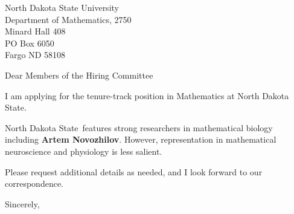 




	
	
	\def\School{North Dakota State}
	
	\begin{letter}
		{North Dakota State University\\
			Department of Mathematics, 2750\\
			Minard Hall 408\\
			PO Box 6050\\
			Fargo ND 58108
		}
		
		\opening{Dear Members of the Hiring Committee}
		
		
		I am applying for the tenure-track position in Mathematics at \School. 
		
		\School~features strong researchers in mathematical biology including \textbf{Artem Novozhilov}. However, representation in mathematical neuroscience and physiology is less salient. 
		
		
		
		
		
		Please request additional details as needed, and I look forward to our correspondence.
		
		\closing{Sincerely,}
	\end{letter}
